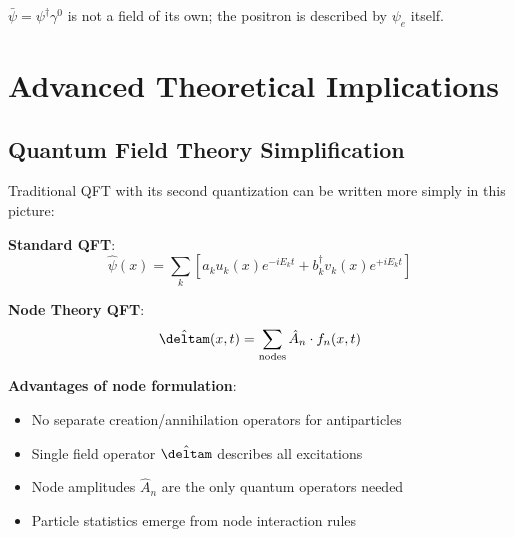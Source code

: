	\begin{table}[htbp]
		\centering
		\caption{Elimination of particle-antiparticle dualism through node theory}
		\label{tab:node_theory_comparison}
	\end{table}
	
	$\bar{\psi} = \psi^\dagger\gamma^0$ is not a field of its own; the positron is described by $\psi_e$ itself.
	
	\section{Advanced Theoretical Implications}
	
	\subsection{Quantum Field Theory Simplification}
	
	Traditional QFT with its second quantization can be written more simply in this picture:
	
	\textbf{Standard QFT}:
	\begin{equation}
		\hat{\psi}(x) = \sum_k \left[ a_k u_k(x) e^{-iE_k t} + b_k^\dagger v_k(x) e^{+iE_k t} \right]
	\end{equation}
	
	\textbf{Node Theory QFT}:
	\begin{equation}
		\hat{\deltam}(x,t) = \sum_{\text{nodes}} \hat{A}_n \cdot f_n(x,t)
	\end{equation}
	
	\textbf{Advantages of node formulation}:
	\begin{itemize}
		\item No separate creation/annihilation operators for antiparticles
		\item Single field operator $\hat{\deltam}$ describes all excitations
		\item Node amplitudes $\hat{A}_n$ are the only quantum operators needed
		\item Particle statistics emerge from node interaction rules
	\end{itemize}
	
